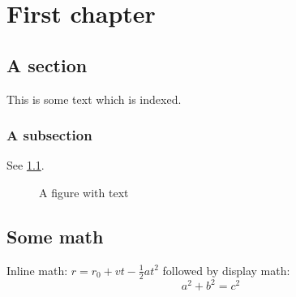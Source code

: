 \chapter{First chapter}

\section{A section}

This is some text which is indexed.

\subsection{A subsection}

See \cref{fig:withtext}.

\begin{figure}\begin{center}
\fbox{\textcolor{blue!50!green}{Text in a figure.}}
\caption{A figure with text\label{fig:withtext}}
\end{center}\end{figure}

\section{Some math}

Inline math: $r = r_0 + vt - \frac{1}{2}at^2$
followed by display math:
\begin{equation}
a^2 + b^2 = c^2
\end{equation}